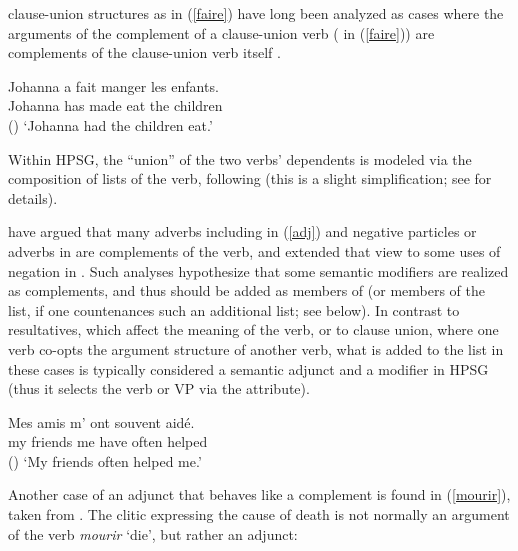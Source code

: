 \documentclass[output=paper
 	        ,biblatex
                ,babelshorthands
                ,newtxmath
                ,draftmode
                ,colorlinks, citecolor=brown
]{langscibook}
\begin{document}
 clause-union structures as in (\ref{faire}) have long been analyzed as cases where the arguments of the complement of a clause-union verb ( in (\ref{faire})) are complements of the clause-union verb itself \citep{Aissen1979}.

\begin{exe}
\ex \label{faire}
\gll Johanna a fait manger les enfants. \\
     Johanna has made eat the children \\\hfill()
\glt `Johanna had the children eat.'
\end{exe}

\noindent
Within HPSG, the ``union'' of the two verbs' dependents is modeled via the composition of \argst lists of the  verb, following \citet{HinrichsandNakazawa1994} (this is a slight simplification; see   for details). 




\citet{AbeilleandGodard1997} have argued that many adverbs including  in (\ref{adj}) and negative particles or adverbs in  are complements of the verb, and \citet{KimandSag2002} extended that view to some uses of negation in . Such analyses hypothesize that some semantic modifiers are realized as complements, and thus should be added as members of \argst (or members of the \deps list, if one countenances such an additional list; see below). In contrast to resultatives, which affect the meaning of the verb, or to clause union, where one verb co-opts the argument structure of another verb, what is added to the \argst list in these cases is typically considered a semantic adjunct and a modifier in HPSG (thus it selects the verb or VP via the  attribute). 

\begin{exe}
\ex\label{adj}
 \gll
	Mes amis m’ ont souvent aidé. \\
	my friends me have often helped \\\hfill()
	\glt `My friends often helped me.'
\end{exe}


Another case of an adjunct that behaves like a complement is found in (\ref{mourir}), taken from \citep[81]{KoenigandDavis2006}.  The clitic  expressing the cause of death   is not normally an argument of the verb \textit{mourir} `die', but rather an adjunct: %
\end{document}
